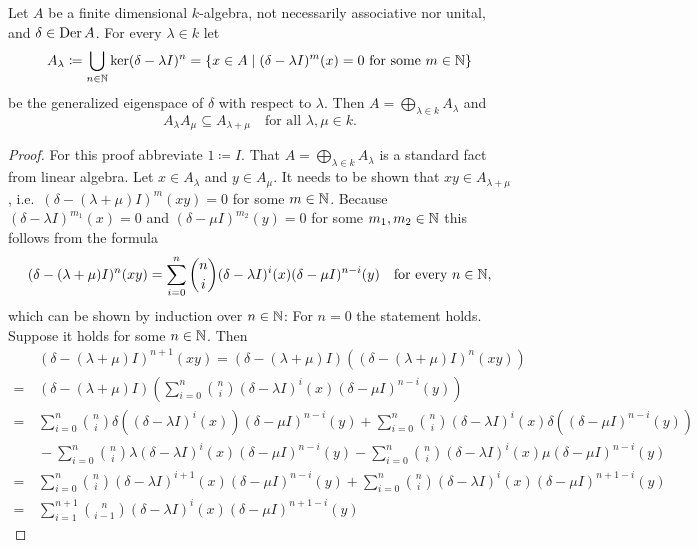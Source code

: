 \begin{lem}\label{lem: generalized eigenspace decomposition for derivations}
 Let $A$ be a finite dimensional $k$-algebra, not necessarily associative nor unital, and $\delta \in \operatorname{Der} A$. For every $\lambda \in k$ let
 \[
  A_\lambda
  \coloneqq \bigcup_{n \in \mathbb{N}} \ker(\delta-\lambda I)^n
  = \{x \in A \mid \text{$(\delta-\lambda I)^m(x) = 0$ for some $m \in \mathbb{N}$}\}
 \]
 be the generalized eigenspace of $\delta$ with respect to $\lambda$. Then $A = \bigoplus_{\lambda \in k} A_\lambda$ and
 \[
  A_\lambda A_\mu \subseteq A_{\lambda + \mu} \quad \text{for all $\lambda, \mu \in k$}.
 \]
\end{lem}
\begin{proof}
 For this proof abbreviate $1 \coloneqq I$. That $A = \bigoplus_{\lambda \in k} A_\lambda$ is a standard fact from linear algebra. Let $x \in A_\lambda$ and $y \in A_\mu$. It needs to be shown that $xy \in A_{\lambda + \mu}$, i.e.\ $(\delta-(\lambda+\mu)I)^m(xy) = 0$ for some $m \in \mathbb{N}$. Because $(\delta-\lambda I)^{m_1}(x) = 0$ and $(\delta-\mu I)^{m_2}(y) = 0$ for some $m_1, m_2 \in \mathbb{N}$ this follows from the formula
 \[
  (\delta-(\lambda+\mu)I)^n(xy)
  = \sum_{i=0}^n \binom{n}{i} (\delta-\lambda I)^i(x) (\delta-\mu I)^{n-i}(y)
  \quad\text{for every $n \in \mathbb{N}$},
 \]
 which can be shown by induction over $n \in \mathbb{N}$: For $n = 0$ the statement holds. Suppose it holds for some $n \in \mathbb{N}$. Then
 \begingroup
 \allowdisplaybreaks
 \begin{align*}
  &\, (\delta-(\lambda+\mu)I)^{n+1}(xy)
  = (\delta-(\lambda+\mu)I)((\delta-(\lambda+\mu)I)^n(xy)) \\
  =&\, (\delta-(\lambda+\mu)I)\left(
       \sum_{i=0}^n \binom{n}{i} (\delta-\lambda I)^i(x) (\delta-\mu I)^{n-i}(y)
       \right) \\
  =&\,  \sum_{i=0}^n \binom{n}{i} \delta\left( (\delta-\lambda I)^i(x) \right) (\delta-\mu I)^{n-i}(y)
       +\sum_{i=0}^n \binom{n}{i} (\delta-\lambda I)^i(x) \delta\left( (\delta-\mu I)^{n-i}(y) \right) \\
   &\, -\sum_{i=0}^n \binom{n}{i} \lambda(\delta-\lambda I)^i(x) (\delta-\mu I)^{n-i}(y)
       -\sum_{i=0}^n \binom{n}{i} (\delta-\lambda I)^i(x) \mu(\delta-\mu I)^{n-i}(y) \\
  =&\,  \sum_{i=0}^n \binom{n}{i} (\delta-\lambda I)^{i+1}(x) (\delta-\mu I)^{n-i}(y)
       +\sum_{i=0}^n \binom{n}{i} (\delta-\lambda I)^i(x) (\delta-\mu I)^{n+1-i}(y) \\
  =&\,  \sum_{i=1}^{n+1} \binom{n}{i-1} (\delta-\lambda I)^i(x) (\delta-\mu I)^{n+1-i}(y)

\end{align*}
\end{proof}
